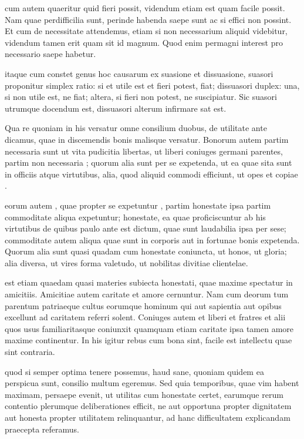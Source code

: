  cum autem quaeritur quid fieri possit, videndum etiam est quam facile possit. Nam quae perdifficilia sunt, perinde habenda saepe sunt ac si effici non possint. Et cum de necessitate attendemus, etiam si non necessarium aliquid videbitur, videndum tamen erit quam sit id magnum. Quod enim permagni interest pro necessario saepe habetur.

 itaque cum constet genus hoc causarum ex suasione et dissuasione, suasori proponitur simplex ratio: si et utile est et fieri potest, fiat; dissuasori duplex: una, si non utile est, ne fiat; altera, si fieri non potest, ne suscipiatur. Sic suasori utrumque docendum est, dissuasori alterum infirmare sat est.

 Qua re quoniam in his versatur omne consilium duobus, de utilitate ante dicamus, quae in discemendis bonis malisque versatur. Bonorum autem partim necessaria sunt ut vita pudicitia libertas, ut liberi coniuges germani parentes, partim non necessaria ; quorum alia sunt per se expetenda, ut ea quae sita sunt in officiis atque virtutibus, alia, quod aliquid commodi efficiunt, ut opes et copiae .

 eorum autem , quae propter se expetuntur , partim honestate ipsa partim commoditate aliqua expetuntur; honestate, ea quae proficiscuntur ab his virtutibus de quibus paulo ante est dictum, quae sunt laudabilia ipsa per sese; commoditate autem aliqua quae sunt in corporis aut in fortunae bonis expetenda. Quorum alia sunt quasi quadam cum honestate coniuncta, ut honos, ut gloria; alia diversa, ut vires forma valetudo, ut nobilitas divitiae clientelae.

 est etiam quaedam quasi materies subiecta honestati, quae maxime spectatur in amicitiis. Amicitiae autem caritate et amore cernuntur. Nam cum deorum tum parentum patriaeque cultus eorumque hominum qui aut sapientia aut opibus excellunt ad caritatem referri solent. Coniuges autem et liberi et fratres et alii quos usus familiaritasque coniunxit quamquam etiam caritate ipsa tamen amore maxime continentur. In his igitur rebus cum bona sint, facile est intellectu quae sint contraria.

 quod si semper optima tenere possemus, haud sane, quoniam quidem ea perspicua sunt, consilio multum egeremus. Sed quia temporibus, quae vim habent maximam, persaepe evenit, ut utilitas cum honestate certet, earumque rerum contentio plerumque deliberationes efficit, ne aut opportuna propter dignitatem aut honesta propter utilitatem relinquantur, ad hanc difficultatem explicandam praecepta referamus.

